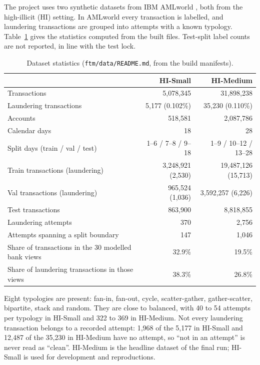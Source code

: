 \documentclass[11pt,a4paper]{article}
\begin{document}
The project uses two synthetic datasets from IBM AMLworld \cite{altman2023}, both from the high-illicit (HI) setting. In AMLworld every transaction is labelled, and laundering transactions are grouped into attempts with a known typology. Table~\ref{tab:data} gives the statistics computed from the built files. Test-split label counts are not reported, in line with the test lock.

\begin{table}[!htbp]
\centering\small
\begin{tabular}{@{}lrr@{}}
\toprule
 & HI-Small & HI-Medium \\
\midrule
Transactions & 5,078,345 & 31,898,238 \\
Laundering transactions & 5,177 (0.102\%) & 35,230 (0.110\%) \\
Accounts & 518,581 & 2,087,786 \\
Calendar days & 18 & 28 \\
Split days (train / val / test) & 1--6 / 7--8 / 9--18 & 1--9 / 10--12 / 13--28 \\
Train transactions (laundering) & 3,248,921 (2,530) & 19,487,126 (15,713) \\
Val transactions (laundering) & 965,524 (1,036) & 3,592,257 (6,226) \\
Test transactions & 863,900 & 8,818,855 \\
Laundering attempts & 370 & 2,756 \\
Attempts spanning a split boundary & 147 & 1,046 \\
Share of transactions in the 30 modelled bank views & 32.9\% & 19.5\% \\
Share of laundering transactions in those views & 38.3\% & 26.8\% \\
\bottomrule
\end{tabular}
\caption{Dataset statistics (\texttt{ftm/data/README.md}, from the build manifests).}
\label{tab:data}
\end{table}

Eight typologies are present: fan-in, fan-out, cycle, scatter-gather, gather-scatter, bipartite, stack and random. They are close to balanced, with 40 to 54 attempts per typology in HI-Small and 322 to 369 in HI-Medium. Not every laundering transaction belongs to a recorded attempt: 1,968 of the 5,177 in HI-Small and 12,487 of the 35,230 in HI-Medium have no attempt, so ``not in an attempt'' is never read as ``clean''. HI-Medium is the headline dataset of the final run; HI-Small is used for development and reproductions.
\end{document}
